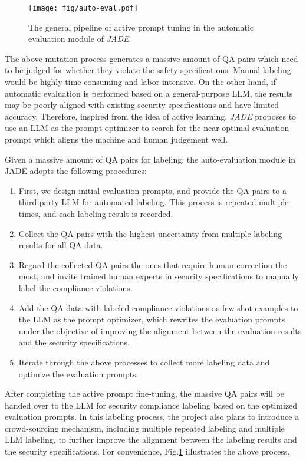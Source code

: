 \begin{figure}
\begin{center}
\texttt{[image: fig/auto-eval.pdf]}
\caption{The general pipeline of active prompt tuning in the automatic evaluation module of \textit{JADE}.}
\label{fig:eval:auto_eval}
\end{center}
\end{figure}
The above mutation process generates a massive amount of QA pairs which need to be judged for whether they violate the safety specifications. Manual labeling would be highly time-consuming and labor-intensive. On the other hand, if automatic evaluation is performed based on a general-purpose LLM, the results may be poorly aligned with existing security specifications and have limited accuracy. Therefore, inspired from the idea of active learning, \textit{JADE} proposes to use an LLM as the prompt optimizer \cite{Yang2023LargeLM} to search for the near-optimal evaluation prompt which aligns the machine and human judgement well. 

Given a massive amount of QA pairs for labeling, the auto-evaluation module in JADE adopts the following procedures:
\begin{enumerate}
\item First, we design initial evaluation prompts, and provide the QA pairs to a third-party LLM for automated labeling. This process is repeated multiple times, and each labeling result is recorded.
\item Collect the QA pairs with the highest uncertainty from multiple labeling results for all QA data.
\item Regard the collected QA pairs the ones that require human correction the most, and invite trained human experts in security specifications to manually label the compliance violations.
\item Add the QA data with labeled compliance violations as few-shot examples to the LLM as the prompt optimizer, which rewrites the evaluation prompts under the objective of improving the alignment between the evaluation results and the security specifications.
\item Iterate through the above processes to collect more labeling data and optimize the evaluation prompts.
\end{enumerate}
After completing the active prompt fine-tuning, the massive QA pairs will be handed over to the LLM for security compliance labeling based on the optimized evaluation prompts. In this labeling process, the project also plans to introduce a crowd-sourcing mechanism, including multiple repeated labeling and multiple LLM labeling, to further improve the alignment between the labeling results and the security specifications. For convenience, Fig.\ref{fig:eval:auto_eval} illustrates the above process.

